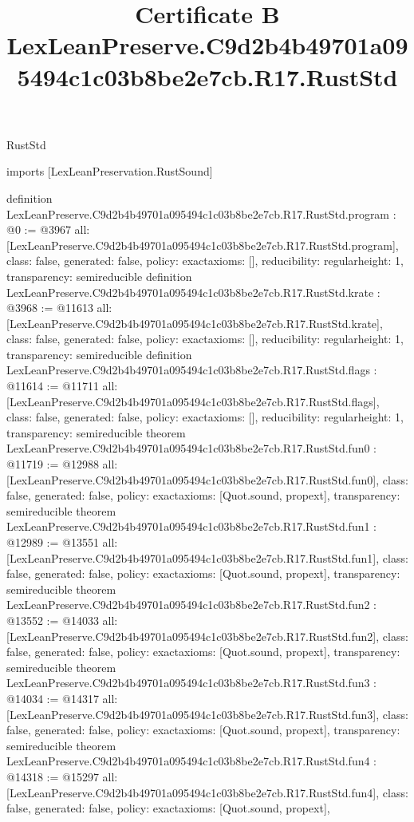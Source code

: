 \begin{lexlean}{RustStd}
\title{Certificate B LexLeanPreserve.C9d2b4b49701a095494c1c03b8be2e7cb.R17.RustStd}
\begin{coremodule}
imports [LexLeanPreservation.RustSound]

definition LexLeanPreserve.C9d2b4b49701a095494c1c03b8be2e7cb.R17.RustStd.program : @0 := @3967 {
  all: [LexLeanPreserve.C9d2b4b49701a095494c1c03b8be2e7cb.R17.RustStd.program],
  class: false,
  generated: false,
  policy: exact{axioms: []},
  reducibility: regular{height: 1},
  transparency: semireducible
}
definition LexLeanPreserve.C9d2b4b49701a095494c1c03b8be2e7cb.R17.RustStd.krate : @3968 := @11613 {
  all: [LexLeanPreserve.C9d2b4b49701a095494c1c03b8be2e7cb.R17.RustStd.krate],
  class: false,
  generated: false,
  policy: exact{axioms: []},
  reducibility: regular{height: 1},
  transparency: semireducible
}
definition LexLeanPreserve.C9d2b4b49701a095494c1c03b8be2e7cb.R17.RustStd.flags : @11614 := @11711 {
  all: [LexLeanPreserve.C9d2b4b49701a095494c1c03b8be2e7cb.R17.RustStd.flags],
  class: false,
  generated: false,
  policy: exact{axioms: []},
  reducibility: regular{height: 1},
  transparency: semireducible
}
theorem LexLeanPreserve.C9d2b4b49701a095494c1c03b8be2e7cb.R17.RustStd.fun0 : @11719 := @12988 {
  all: [LexLeanPreserve.C9d2b4b49701a095494c1c03b8be2e7cb.R17.RustStd.fun0],
  class: false,
  generated: false,
  policy: exact{axioms: [Quot.sound, propext]},
  transparency: semireducible
}
theorem LexLeanPreserve.C9d2b4b49701a095494c1c03b8be2e7cb.R17.RustStd.fun1 : @12989 := @13551 {
  all: [LexLeanPreserve.C9d2b4b49701a095494c1c03b8be2e7cb.R17.RustStd.fun1],
  class: false,
  generated: false,
  policy: exact{axioms: [Quot.sound, propext]},
  transparency: semireducible
}
theorem LexLeanPreserve.C9d2b4b49701a095494c1c03b8be2e7cb.R17.RustStd.fun2 : @13552 := @14033 {
  all: [LexLeanPreserve.C9d2b4b49701a095494c1c03b8be2e7cb.R17.RustStd.fun2],
  class: false,
  generated: false,
  policy: exact{axioms: [Quot.sound, propext]},
  transparency: semireducible
}
theorem LexLeanPreserve.C9d2b4b49701a095494c1c03b8be2e7cb.R17.RustStd.fun3 : @14034 := @14317 {
  all: [LexLeanPreserve.C9d2b4b49701a095494c1c03b8be2e7cb.R17.RustStd.fun3],
  class: false,
  generated: false,
  policy: exact{axioms: [Quot.sound, propext]},
  transparency: semireducible
}
theorem LexLeanPreserve.C9d2b4b49701a095494c1c03b8be2e7cb.R17.RustStd.fun4 : @14318 := @15297 {
  all: [LexLeanPreserve.C9d2b4b49701a095494c1c03b8be2e7cb.R17.RustStd.fun4],
  class: false,
  generated: false,
  policy: exact{axioms: [Quot.sound, propext]},
}
\end{coremodule}
\end{lexlean}
